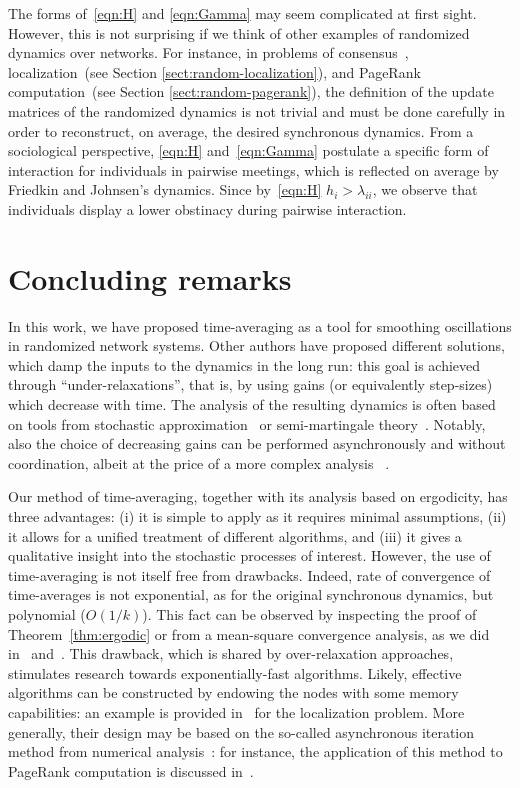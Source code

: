 \documentclass{IEEEtran}
\newcommand{\1}{\mathbf{1}} \newcommand{\ind}{\mathds{1}}
\begin{document}
The forms of~\eqref{eqn:H} and \eqref{eqn:Gamma} may seem complicated at first sight. However, this is not surprising if we think of other examples of randomized dynamics over networks. For instance, in problems of consensus~\cite{FF-SZ:08a}, localization~(see Section \ref{sect:random-localization}), and PageRank computation~(see Section \ref{sect:random-pagerank}), the definition of the update matrices of the randomized dynamics is not trivial and must be done carefully in order to reconstruct, on average, the desired synchronous dynamics.
From a sociological perspective, \eqref{eqn:H} and~\eqref{eqn:Gamma} postulate a specific form of interaction for individuals in pairwise meetings, which is reflected on average by Friedkin and Johnsen's dynamics. Since by~\eqref{eqn:H} $h_i>\lambda_{ii}$, we observe that individuals display a lower obstinacy during pairwise interaction.


\section{Concluding remarks}\label{sect:conclusion}
In this work, we have proposed time-averaging as a tool for smoothing oscillations in randomized network systems.  Other authors have proposed different solutions, which damp the inputs to the dynamics in the long run: this goal is achieved through ``under-relaxations'', that is, by using gains (or equivalently step-sizes) which decrease with time.
The analysis of the resulting dynamics is often based on tools from stochastic approximation~\cite{VSB:08} or semi-martingale theory~\cite[Ch~2]{BP:87}. Notably, also the choice of decreasing gains can be performed asynchronously and without coordination, albeit at the price of a more complex analysis~\cite[Ch.~7]{VSB:08} \cite{AN:11}.


Our method of time-averaging, together with its analysis based on ergodicity, has three advantages:  (i) it is simple to apply as it requires minimal assumptions, (ii) it allows for a unified treatment of different algorithms, and (iii) it gives a qualitative insight into the stochastic processes of interest. 
However, the use of time-averaging is not itself free from drawbacks. Indeed, rate of convergence of time-averages is not exponential, as for the original synchronous dynamics, but polynomial ($O(1/k)$).
This fact can be observed by inspecting the proof of Theorem~\ref{thm:ergodic} or from a mean-square convergence analysis, as we did in~\cite{HI-RT:10} and~\cite{CR-PF-HI-RT:13a}.
This drawback, which is shared by over-relaxation approaches, stimulates research towards exponentially-fast algorithms. Likely, effective algorithms can be constructed by endowing the nodes with some memory capabilities: an example is provided in~\cite{RC-AC-LS-MT:13} for the localization problem. More generally, their design may be based on the so-called asynchronous iteration method from numerical analysis~\cite[Section 6.2]{DPB-JNT:89}: for instance, the application of this method to PageRank computation is discussed in~\cite[Section~VII]{HI-RT:10}.
\end{document}
